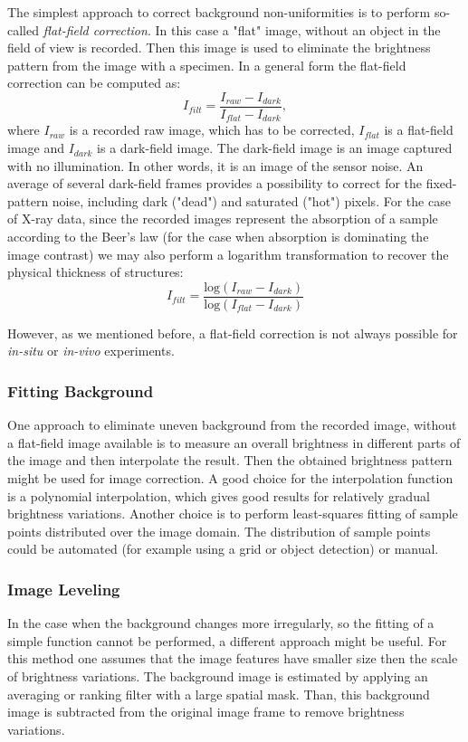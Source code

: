 The simplest approach to correct background non-uniformities is to perform so-called \textit{flat-field correction}. In this case a "flat" image, without an object in the field of view is recorded. Then this image is used to eliminate the brightness pattern from the image with a specimen. In a general form the flat-field correction can be computed as:
$$I_{filt} = \frac{I_{raw} -  I_{dark} }{I_{flat} - I_{dark}},$$
where $I_{raw}$ is a recorded raw image, which has to be corrected, $I_{flat}$ is a flat-field image and $I_{dark}$ is a dark-field image. The dark-field image is an image captured with no illumination. In other words, it is an image of the sensor noise. An average of several dark-field frames provides a possibility to correct for the fixed-pattern noise, including dark ("dead") and saturated ("hot") pixels. 
For the case of X-ray data, since the recorded images represent the absorption of a sample according to the Beer's law (for the case when absorption is dominating the image contrast) we may also perform a logarithm transformation to recover the physical thickness of structures:
$$I_{filt} = \frac{\text{log}(I_{raw} -  I_{dark}) }{\text{log}(I_{flat} - I_{dark})}$$

However, as we mentioned before, a flat-field correction is not always possible for \textit{in-situ} or \textit{in-vivo} experiments.      

\subsubsection{Fitting Background}

One approach to eliminate uneven background from the recorded image, without a flat-field image available is to measure an overall brightness in different parts of the image and then interpolate the result. Then the obtained brightness pattern might be used for image correction. A good choice for the interpolation function is a polynomial interpolation, which gives good results for relatively gradual brightness variations. Another choice is to perform least-squares fitting of sample points distributed over the image domain. The distribution of sample points could be automated (for example using a grid or object detection) or manual.  

\subsubsection{Image Leveling}
\label{image_leveling}

In the case when the background changes more irregularly, so the fitting of a simple function cannot be performed, a different approach might be useful. For this method one assumes that the image features have smaller size then the scale of brightness variations.
The background image is estimated by applying an averaging or ranking filter with a large spatial mask. Than, this background image is subtracted from the original image frame to remove brightness variations.

